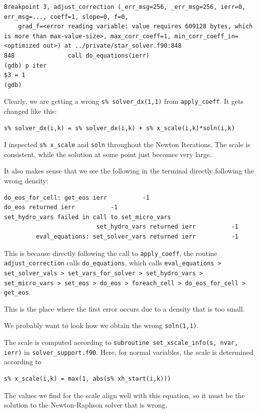 \documentclass[a4paper,10pt]{article}
\begin{document}
\begin{verbatim}
Breakpoint 3, adjust_correction (_err_msg=256, _err_msg=256, ierr=0, err_msg=..., coeff=1, slope=0, f=0, 
    grad_f=<error reading variable: value requires 609128 bytes, which is more than max-value-size>, max_corr_coeff=1, min_corr_coeff_in=<optimized out>) at ../private/star_solver.f90:848
848	              call do_equations(ierr)               
(gdb) p iter
$3 = 1
(gdb) 
\end{verbatim}

Clearly, we are getting a wrong \lstinline[style=output, breaklines=true]|s% solver_dx(1,1)| from \lstinline[style=output, breaklines=true]|apply_coeff|. It gets changed like this:
\begin{verbatim}
s% solver_dx(i,k) = s% solver_dx(i,k) + s% x_scale(i,k)*soln(i,k)
\end{verbatim}
I inspected \lstinline[style=output, breaklines=true]|s% x_scale| and \lstinline[style=output, breaklines=true]|soln| throughout the Newton Iterations. The scale is consistent, while the solution at some point just becomes very large.

It also makes sense that we see the following in the terminal directly following the wrong density:
\begin{verbatim}
do_eos_for_cell: get_eos ierr          -1
do_eos returned ierr          -1
set_hydro_vars failed in call to set_micro_vars
                          set_hydro_vars returned ierr          -1
         eval_equations: set_solver_vars returned ierr          -1
\end{verbatim}
This is because directly following the call to \lstinline[style=output, breaklines=true]|apply_coeff|, the routine \lstinline[style=output, breaklines=true]|adjust_correction| calls \lstinline[style=output, breaklines=true]|do_equations|, which calls \lstinline[style=output, breaklines=true]|eval_equations > set_solver_vals > set_vars_for_solver > set_hydro_vars > set_micro_vars > set_eos > do_eos > foreach_cell > do_eos_for_cell > get_eos|.

This is the place where the first error occurs due to a density that is too small.

We probably want to look how we obtain the wrong \lstinline[style=output, breaklines=true]|soln(1,1)|.

The scale is computed according to \lstinline[style=output, breaklines=true]|subroutine set_xscale_info(s, nvar, ierr)| in \lstinline[style=output, breaklines=true]|solver_support.f90|.
\nextpage
Here, for normal variables, the scale is determined according to
\begin{verbatim}
s% x_scale(i,k) = max(1, abs(s% xh_start(i,k)))
\end{verbatim}
The values we find for the scale align well with this equation, so it must be the solution to the Newton-Raphson solver that is wrong.
\end{document}
